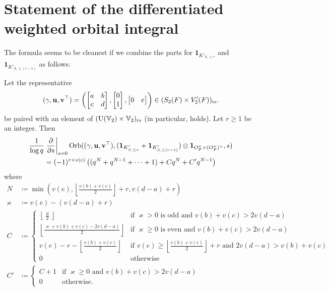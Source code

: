 \section{Statement of the differentiated weighted orbital integral}
The formula seems to be cleanest if we combine the parts
for $\mathbf{1}_{K'_{S, \le r}}$ and $\mathbf{1}_{K'_{S, \le (r-1)}}$ as follows:

\begin{theorem}
  \label{thm:semi_lie_combo}
  Let the representative
  \[
    {(\gamma, \mathbf u, \mathbf v^\top)} = \left( \begin{bmatrix} a & b \\ c & d \end{bmatrix},
      \begin{bmatrix} 0 \\ 1 \end{bmatrix},
      \begin{bmatrix} 0 & e \end{bmatrix} \right)
    \in (S_2(F) \times V_2'(F))_{\mathrm{rs}}.
  \]
  be paired with an element of $(\operatorname{U}(\mathbb V_2) \times \mathbb V_2)_{\mathrm{rs}}$
  (in particular,  holds).
  Let $r \ge 1$ be an integer.
  Then
  \begin{align*}
    \frac{1}{\log q} &\left. \pdv{}{s} \right\rvert_{s=0}
    \operatorname{Orb}({(\gamma, \mathbf u, \mathbf v^\top)}, (\mathbf{1}_{K'_{S, \le r}} + \mathbf{1}_{K'_{S, \le (r-1)}}) \otimes \mathbf{1}_{O_F^n \times (O_F^n)^\vee}, s) \\
    &= (-1)^{r+v(c)}\left( (q^N + q^{N-1} + \dots + 1) + C q^N + C' q^{N-1} \right)
  \end{align*}
  where
  \begin{align*}
    N &\coloneqq \min\left( v(e),
    \left\lfloor \frac{v(b)+v(c)}{2} \right\rfloor + r, v(d-a) + r \right) \\
    \varkappa &\coloneqq v(e) - (v(d-a)+r) \\
    C &\coloneqq
    \begin{cases}
      \left\lfloor \frac{\varkappa}{2} \right\rfloor
        & \text{if } \varkappa > 0 \text{ is odd}
          \text{ and } v(b) + v(c) > 2v(d-a)  \\
      \left\lfloor \frac{\varkappa+v(b)+v(c)-2v(d-a)}{2} \right\rfloor
        & \text{if } \varkappa \ge 0 \text{ is even}
          \text{ and } v(b) + v(c) > 2v(d-a)  \\
      v(e) - r - \left\lfloor \frac{v(b)+v(c)}{2} \right\rfloor
        & \text{if } v(e) \ge \left\lfloor \frac{v(b)+v(c)}{2} \right\rfloor + r
        \text{ and } 2v(d-a) > v(b) + v(c) \\
      0 & \text{otherwise}
    \end{cases} \\
    C' &\coloneqq
    \begin{cases}
      C + 1 & \text{if } \varkappa \ge 0 \text{ and } v(b)+v(c) > 2v(d-a) \\
      0 & \text{otherwise}.
    \end{cases}
  \end{align*}
\end{theorem}

